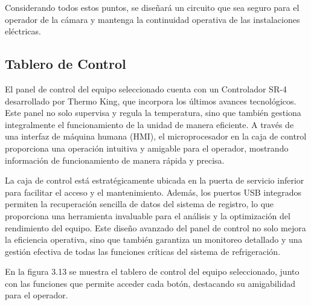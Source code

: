  Considerando todos estos puntos, se diseñará un circuito que sea seguro para el operador de la cámara y mantenga la continuidad operativa de las instalaciones eléctricas.  
 
 
 
 
 \subsection{Tablero de Control}
 
 El panel de control del equipo seleccionado cuenta con un Controlador SR-4 desarrollado por Thermo King, que incorpora los últimos avances tecnológicos. Este panel no solo supervisa y regula la temperatura, sino que también gestiona integralmente el funcionamiento de la unidad de manera eficiente. A través de una interfaz de máquina humana (HMI), el microprocesador en la caja de control proporciona una operación intuitiva y amigable para el operador, mostrando información de funcionamiento de manera rápida y precisa.
 
 La caja de control está estratégicamente ubicada en la puerta de servicio inferior para facilitar el acceso y el mantenimiento. Además, los puertos USB integrados permiten la recuperación sencilla de datos del sistema de registro, lo que proporciona una herramienta invaluable para el análisis y la optimización del rendimiento del equipo. Este diseño avanzado del panel de control no solo mejora la eficiencia operativa, sino que también garantiza un monitoreo detallado y una gestión efectiva de todas las funciones críticas del sistema de refrigeración.
 
 En la figura 3.13 se muestra el tablero de control del equipo seleccionado, junto con las funciones que permite acceder cada botón, destacando su amigabilidad para el operador.

